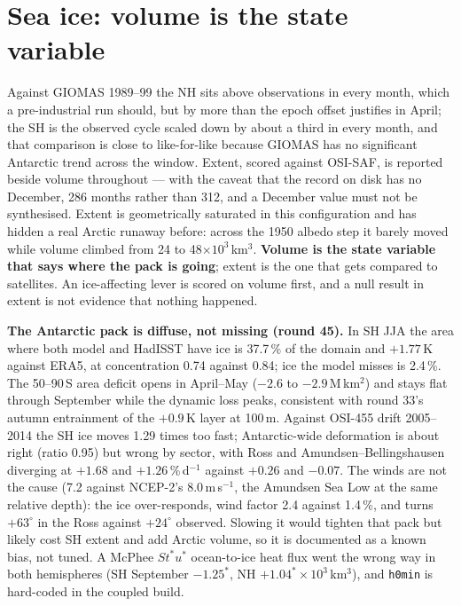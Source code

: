 \documentclass[10pt]{article}
\begin{document}
\section{Sea ice: volume is the state variable}\label{sec:ice}

Against GIOMAS 1989--99 the NH sits above observations in every month, which a
pre-industrial run should, but by more than the epoch offset justifies in April; the SH is
the observed cycle scaled down by about a third in every month, and that comparison is
close to like-for-like because GIOMAS has no significant Antarctic trend across the window.
Extent, scored against OSI-SAF, is reported beside volume throughout --- with the caveat
that the record on disk has no December, 286 months rather than 312, and a December value
must not be synthesised. Extent is geometrically saturated in this configuration and has
hidden a real Arctic runaway before: across the 1950 albedo step it barely moved while volume climbed from 24 to
48$\times10^3$\,km$^3$. \textbf{Volume is the state variable that says where the pack is
going}; extent is the one that gets compared to satellites. An ice-affecting lever is
scored on volume first, and a null result in extent is not evidence that nothing happened.

\textbf{The Antarctic pack is diffuse, not missing (round 45).} In SH JJA the area where both model
and HadISST have ice is 37.7\,\% of the domain and $+1.77$\,K against ERA5, at concentration 0.74
against 0.84; ice the model misses is 2.4\,\%. The 50--90\,S area deficit opens in April--May
($-2.6$ to $-2.9$\,M\,km$^2$) and stays flat through September while the dynamic loss peaks,
consistent with round 33's autumn entrainment of the $+0.9$\,K layer at 100\,m. Against OSI-455
drift 2005--2014 the SH ice moves 1.29 times too fast; Antarctic-wide deformation is about right
(ratio 0.95) but wrong by sector, with Ross and Amundsen--Bellingshausen diverging at $+1.68$ and
$+1.26$\,\%\,d$^{-1}$ against $+0.26$ and $-0.07$. The winds are not the cause (7.2 against NCEP-2's
8.0\,m\,s$^{-1}$, the Amundsen Sea Low at the same relative depth): the ice over-responds, wind factor
2.4 against 1.4\,\%, and turns $+63^\circ$ in the Ross against $+24^\circ$ observed. Slowing it would
tighten that pack but likely cost SH extent and add Arctic volume, so it is documented as a known
bias, not tuned. A McPhee $St^*u^*$ ocean-to-ice heat flux went the wrong way in both hemispheres
(SH September $-1.25^*$, NH $+1.04^*\times10^3$\,km$^3$), and \texttt{h0min} is hard-coded in the
coupled build.
\end{document}
